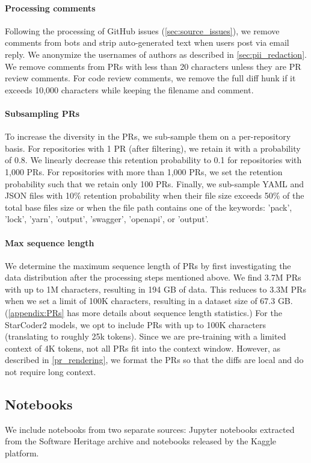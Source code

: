 \documentclass[10pt]{article} %
\begin{document}
\paragraph{Processing comments} Following the processing of GitHub issues (\cref{sec:source_issues}), we remove comments from bots and strip auto-generated text when users post via email reply. We anonymize the usernames of authors as described in \cref{sec:pii_redaction}. We remove comments from PRs with less than 20 characters unless they are PR review comments. For code review comments, we remove the full diff hunk if it exceeds 10,000 characters while keeping the filename and comment.  

\paragraph{Subsampling PRs} To increase the diversity in the PRs, we sub-sample them on a per-repository basis. For repositories with 1 PR (after filtering), we retain it with a probability of 0.8.  We linearly decrease this retention probability to 0.1 for repositories with 1,000 PRs. For repositories with more than 1,000 PRs, we set the retention probability such that we retain only 100 PRs. Finally, we sub-sample YAML and JSON files with 10\% retention probability when their file size exceeds 50\% of the total base files size or when the file path contains one of the keywords: 'pack', 'lock', 'yarn', 'output', 'swagger', 'openapi', or 'output'. 


\paragraph{Max sequence length} We determine the maximum sequence length of PRs by first investigating the data distribution after the processing steps mentioned above. We find 3.7M PRs with up to 1M characters, resulting in 194 GB of data. This reduces to 3.3M PRs when we set a limit of 100K characters, resulting in a dataset size of 67.3 GB. (\cref{appendix:PRs} has more details about sequence length statistics.) For the StarCoder2 models, we opt to include PRs with up to 100K characters (translating to roughly 25k tokens). Since we are pre-training with a limited context of 4K tokens, not all PRs fit into the context window. However, as described in \cref{pr_rendering}, we format the PRs so that the diffs are local and do not require long context. 

\subsection{Notebooks}\label{sec:source_notebooks}
We include notebooks from two separate sources: Jupyter notebooks extracted from the Software Heritage archive and notebooks released by the Kaggle platform. 
\end{document}
